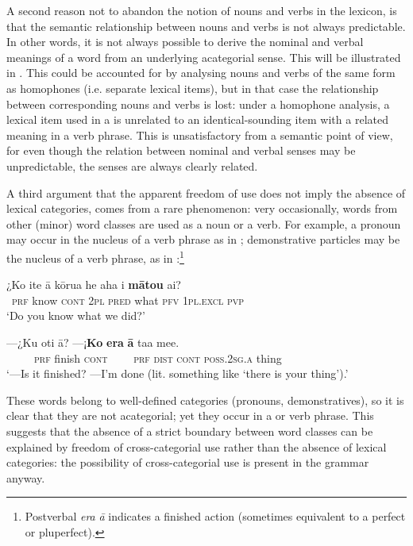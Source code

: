 A second reason not to abandon the notion of nouns and verbs in the lexicon, is that the semantic relationship between nouns and verbs is not always predictable. In other words, it is not always possible to derive the nominal and verbal meanings of a word from an underlying acategorial sense. This will be illustrated in . This could be accounted for by analysing nouns and verbs of the same form as homophones (i.e. separate lexical items), but in that case the relationship between corresponding nouns and verbs is lost: under a homophone analysis, a lexical item used in a  is unrelated to an identical-sounding item with a related meaning in a verb phrase. This is unsatisfactory from a semantic point of view, for even though the relation between nominal and verbal senses may be unpredictable, the senses are always clearly related. 

A third argument that the apparent freedom of use does not imply the absence of lexical categories, comes from a rare phenomenon: very occasionally, words from other (minor) word classes are used as a noun or a verb. For example, a pronoun may occur in the nucleus of a verb phrase as in ; demonstrative particles may be the nucleus of a verb phrase, as in :\footnote{\label{fn:91}Postverbal \textit{era} \textit{{\ꞌ}ā} indicates a finished action (sometimes equivalent to a perfect or pluperfect).} 

\ea\label{ex:3.5}
\gll ¿Ko {\ꞌ}ite {\ꞌ}ā kōrua he aha i \textbf{mātou} ai?\\
~\textsc{prf} know \textsc{cont} \textsc{2pl} \textsc{pred} what \textsc{pfv} \textsc{1pl.excl} \textsc{pvp}\\

\glt 
‘Do you know what we did?’ 
\z

\ea\label{ex:3.6}
\gll —¿Ku oti {\ꞌ}ā? —¡\textbf{Ko} \textbf{era} \textbf{{\ꞌ}ā} ta{\ꞌ}a me{\ꞌ}e. \\
~~~~~\textsc{prf} finish \textsc{cont}  ~~~~\textsc{prf} \textsc{dist} \textsc{cont} \textsc{poss.2sg.a} thing \\

\glt
‘—Is it finished? —I’m done (lit. something like ‘there is your thing’).’ \textstyleExampleref{[R230.105]} 
\z

These words belong to well-defined categories (pronouns, demonstratives), so it is clear that they are not acategorial; yet they occur in a  or verb phrase. This suggests that the absence of a strict boundary between word classes can be explained by freedom of cross-categorial use rather than the absence of lexical categories: the possibility of cross-categorial use is present in the grammar anyway.

